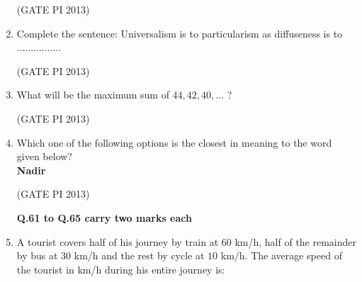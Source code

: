 \documentclass[journal,12pt,onecolumn]{IEEEtran}
\theoremstyle{remark}
\begin{document}
\begin{enumerate}
\hfill (GATE PI 2013)

\item Complete the sentence:  
Universalism is to particularism as diffuseness is to ................
\begin{enumerate}
\end{enumerate}

\hfill (GATE PI 2013)


\item What will be the maximum sum of $44, 42, 40, \ldots$ ?
\begin{enumerate}
\end{enumerate}

\hfill (GATE PI 2013)

\item Which one of the following options is the closest in meaning to the  word given below? \\ 
\textbf{Nadir}
\begin{enumerate}
\end{enumerate}

\hfill (GATE PI 2013)

\textbf{Q.61 to Q.65 carry two marks each} \\

\item A tourist covers half of his journey by train at $60$ km/h, half of the remainder by bus at $30$ km/h and the rest by cycle at $10$ km/h.  
The average speed of the tourist in km/h during his entire journey is:
\begin{enumerate}
\end{enumerate}


\end{enumerate}
\end{document}
